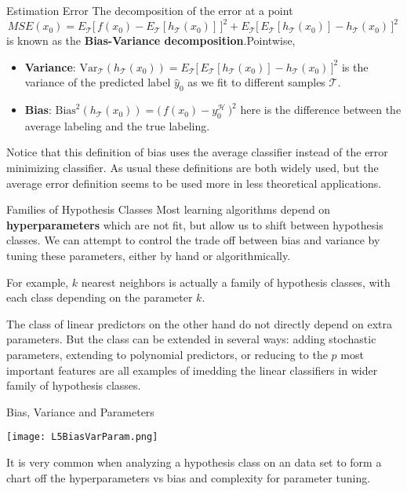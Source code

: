 \documentclass[10pt, table, dvipsnames,handout]{beamer}
\newcommand{\cT}{\ensuremath{\mathcal{T}}}
\newcommand{\cH}{\ensuremath{\mathcal{H}}}
\begin{document}
\begin{frame}[fragile]{Estimation Error}
The decomposition of the error at a point
$$
MSE(x_0) = E_\cT\big[ \,f(x_0) - E_\cT[h_\cT(x_0)]\,\big]^2 +  E_\cT \big[\, E_\cT[h_\cT(x_0)] - h_\cT(x_0)\,\big]^2 \,
$$
is known as the \textbf{Bias-Variance decomposition}.\pause Pointwise,
\begin{itemize}
\item[] \textbf{Variance}: $\text{Var}_\cT( h_\cT(x_0) ) =  E_\cT \big[\, E_\cT[h_\cT(x_0)]  - h_\cT(x_0)\,\big]^2$ is the variance of the predicted label $\hat {y}_0$ as we fit to different samples $\cT$.\pause 
\item[] \textbf{Bias}: $\text{Bias}^2(h_\cT(x_0) ) = \big( \,f(x_0) - y_0^\cH\,\big)^2$ here is the difference between the average labeling and the true labeling. \pause 
\end{itemize}
Notice that this definition of bias uses the average classifier instead of the error minimizing classifier. As usual these definitions are both widely used, but the average error definition seems to be used more in less theoretical applications. 
\end{frame}



\begin{frame}[fragile]{Families of Hypothesis Classes}
Most learning algorithms depend on \textbf{hyperparameters} which are not fit, but allow us to shift between hypothesis classes. We can attempt to control the trade off between bias and variance by tuning these parameters, either by hand or algorithmically. \pause

For example, $k$ nearest neighbors is actually a family of hypothesis classes, with each class depending on the parameter $k$.\pause

The class of linear predictors on the other hand do not directly depend on extra parameters. But the class can be extended in several ways: adding stochastic parameters, extending to polynomial predictors, or reducing to the $p$ most important features are all examples of imedding the linear classifiers in wider family of hypothesis classes. 

\end{frame}




\begin{frame}[fragile]{Bias, Variance and Parameters}
  \begin{minipage}[t][0.5\textheight][t]{\textwidth}
	  \centering \texttt{[image: L5BiasVarParam.png]}
  \end{minipage}
  \vfill
  \begin{minipage}[t][0.5\textheight][t]{\textwidth}
It is very common when analyzing a hypothesis class on an data set to form a chart off the hyperparameters vs bias and complexity for parameter tuning. 

\end{minipage}
\end{frame}
\end{document}
